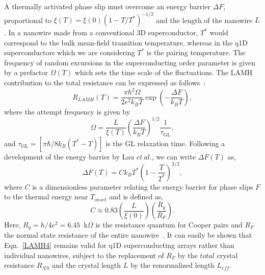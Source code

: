 \documentclass[prb,twocolumn,showpacs,preprintnumbers,amsmath,amssymb,floatfix,groupedaddress,superscriptaddress,aps,10pt]{revtex4-1}
\begin{document}
{{A thermally activated phase slip must overcome an energy barrier $\Delta F$, proportional to $\xi(T)=\xi(0)(1-T/T^*)^{-1/2}$ and the length of the nanowire $L$. In a nanowire made from a conventional 3D superconductor, $T^*$ would correspond to the bulk mean-field transition temperature, whereas in the q1D superconductors which we are considering $T^*$ is the pairing temperature.  The frequency of random excursions in the superconducting order parameter is given by a prefactor $\Omega(T)$ which sets the time scale of the fluctuations. The LAMH contribution to the total resistance can be expressed as 
follows~\cite{Langer1967,McCumber1970}:  
\begin{equation} \label{LAMH1}
R_{LAMH}(T)=\frac{\pi \hbar^{2}\Omega}{2e^{2}k_{B}T}\exp\left( -\frac{\Delta F}{k_{B}T}\right),
\end{equation} 
where the attempt frequency is given by
\begin{equation} \label{LAMH2}
\Omega=\frac{L}{\xi(T)}\left(\frac{\Delta F}{k_{B}T}\right)^{1/2}\frac{1}{\tau_{\mathrm{GL}}},
\end{equation}
and $\tau_{\mathrm{GL}}=[\pi\hbar/8k_{B}(T^*-T)]$ is the GL relaxation time. Following a development of the energy barrier by Lau $et\ al.$\cite{Lau2001}, we can write $\Delta F(T)$ as, 
\begin{equation} \label{LAMH3}
\Delta F(T)=Ck_{B}T^*\left(1-\frac{T}{T^*} \right)^{3/2},
\end{equation}	
where $C$ is a dimensionless parameter relating the energy barrier for phase slips $F$ to the thermal energy near $T_{onset}$ and is defined as,
\begin{equation} \label{LAMH4}
C\approx0.83\left(\frac{L}{\xi(0)}\right)\left(\frac{R_{q}}{R_{F}}\right).
\end{equation}
Here, $R_{q}=h/4e^{2}=6.45$~k$\Omega$ is the resistance quantum for Cooper pairs and $R_{F}$ the normal state resistance of the entire nanowire~\cite{Cirillo2012}. It can easily be shown that Eqn.~\ref{LAMH4} remains valid for q1D superconducting arrays rather than individual nanowires, subject to the replacement of $R_{F}$ by the $total$ crystal resistance $R_{NS}$ and the crystal length $L$ by the renormalized length $L_{eff}$.

}}
\end{document}
